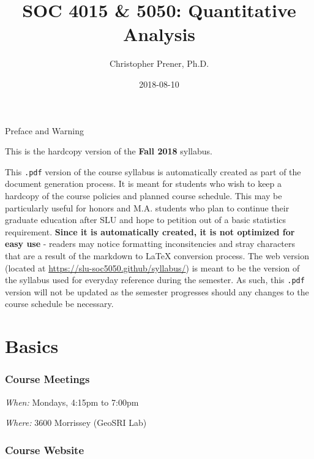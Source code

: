 \documentclass[]{book}
\title{SOC 4015 \& 5050: Quantitative Analysis}
\author{Christopher Prener, Ph.D.}
\date{2018-08-10}
\theoremstyle{definition}
\theoremstyle{definition}
\theoremstyle{definition}
\theoremstyle{remark}
\begin{document}
\maketitle

\begin{center}
{\huge Preface and Warning} \\
\end{center}
\vspace{5mm}
This is the hardcopy version of the \textbf{Fall 2018} syllabus.
\vspace{5mm}
\par \noindent This \texttt{.pdf} version of the course syllabus is automatically created as part of the document generation process. It is meant for students who wish to keep a hardcopy of the course policies and planned course schedule. This may be particularly useful for honors and M.A. students who plan to continue their graduate education after SLU and hope to petition out of a basic statistics requirement. \textbf{Since it is automatically created, it is not optimized for easy use} - readers may notice formatting inconsitencies and stray characters that are a result of the markdown to \LaTeX{} conversion process. The web version (located at \href{https://slu-soc5050.github/syllabus/}{https://slu-soc5050.github/syllabus/}) is meant to be the version of the syllabus used for everyday reference during the semester. As such, this \texttt{.pdf} version will not be updated as the semester progresses should any changes to the course schedule be necessary.

\hypertarget{basics}{%
\chapter*{Basics}\label{basics}}

\hypertarget{course-meetings}{%
\subsection*{Course Meetings}\label{course-meetings}}

\emph{When:} Mondays, 4:15pm to 7:00pm

\emph{Where:} 3600 Morrissey (GeoSRI Lab)

\hypertarget{course-website}{%
\subsection*{Course Website}\label{course-website}}
\end{document}

